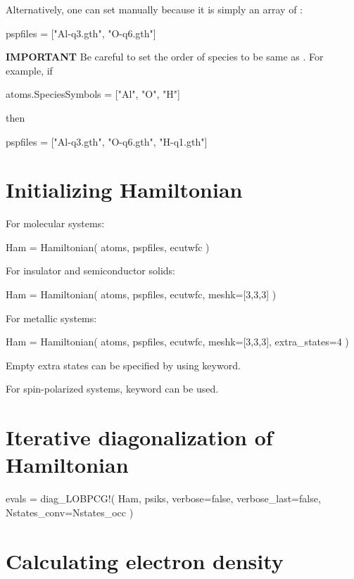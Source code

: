 Alternatively, one can set  manually because it is simply
an array of :
\begin{juliacode}
pspfiles = ["Al-q3.gth", "O-q6.gth"]
\end{juliacode}

\textbf{IMPORTANT} Be careful to set the order of species to be same as
. For example, if
\begin{juliacode}
atoms.SpeciesSymbols = ["Al", "O", "H"]
\end{juliacode}
then
\begin{juliacode}
pspfiles = ["Al-q3.gth", "O-q6.gth", "H-q1.gth"]
\end{juliacode}

\section{Initializing Hamiltonian}

For molecular systems:
\begin{juliacode}
Ham = Hamiltonian( atoms, pspfiles, ecutwfc )
\end{juliacode}

For insulator and semiconductor solids:
\begin{juliacode}
Ham = Hamiltonian( atoms, pspfiles, ecutwfc, meshk=[3,3,3] )
\end{juliacode}

For metallic systems:
\begin{juliacode}
Ham = Hamiltonian( atoms, pspfiles, ecutwfc, meshk=[3,3,3], extra_states=4 )
\end{juliacode}

Empty extra states can be specified by using  keyword.

For spin-polarized systems,  keyword can be used.


\section{Iterative diagonalization of Hamiltonian}

\begin{juliacode}
evals =  diag_LOBPCG!( Ham, psiks, verbose=false, verbose_last=false,
                       Nstates_conv=Nstates_occ )
\end{juliacode}


\section{Calculating electron density}

